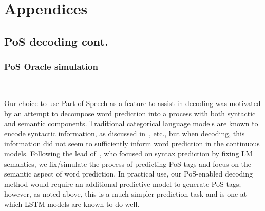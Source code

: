 \documentclass[11pt,a4paper]{article}
\begin{document}






\newpage
\newpage
\appendix
\section{Appendices}
\label{sec:appendix}
\subsection{PoS decoding cont.}

\subsubsection{PoS Oracle simulation}~\label{simulation}


Our choice to use Part-of-Speech as a feature to assist in decoding was motivated by an attempt to decompose word prediction into a process with both syntactic and semantic components. Traditional categorical language models are known to encode syntactic information, as discussed in~\cite{goldberg2019assessing, linzen2016assessing}, etc., but when decoding, this information did not seem to sufficiently inform word prediction in the continuous models. Following the lead of~\cite{czarnowska2019don}, who focused on syntax prediction by fixing LM semantics, we fix/simulate the process of predicting PoS tags and focus on the semantic aspect of word prediction. In practical use, our PoS-enabled decoding method would require an additional predictive model to generate PoS tags; however, as noted above, this is a much simpler prediction task and is one at which LSTM models are known to do well.  
\end{document}
